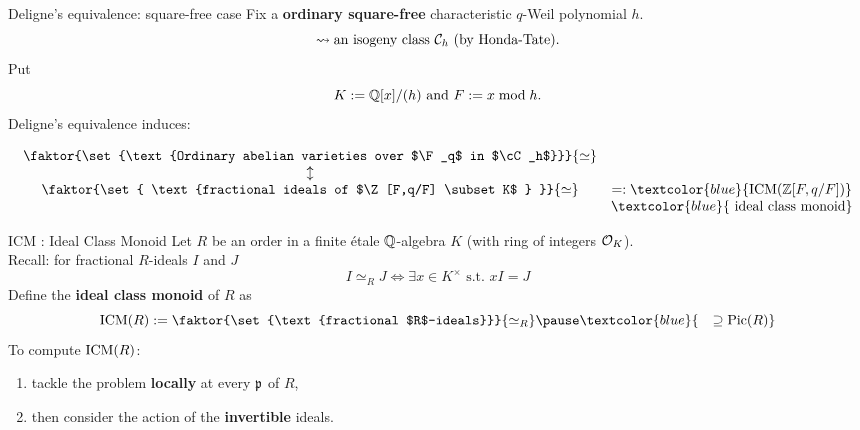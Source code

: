 \documentclass[handout]{beamer}
\begin{document}
\begin{frame}{ Deligne's equivalence: square-free case}
Fix a \textbf{ordinary square-free} characteristic $q$-Weil polynomial $h$.\\
\[\rightsquigarrow \text{an isogeny class ${\mathcal C}_h$ (by Honda-Tate)}.\]
\pause Put 
\[K := \mathbb{Q}[x]/(h) \text{ and } F:= x \bmod h. \]
\pause Deligne's equivalence induces:
\begin{theorem}[M.]
\vspace{-5mm}\[\begin{array}{cc}
\faktor{\set{\text{Ordinary abelian varieties over $\F_q$ in $\cC_h$}}}{\simeq} & \\
\updownarrow & \\
\faktor{\set{ \text{fractional ideals of $\Z[F,q/F] \subset K$ } }}{\simeq} & =:\textcolor{blue}{\ICM(\Z[F,q/F])}\\ 
  & \textcolor{blue}{\text{ ideal class monoid} }
  \end{array}\]
\end{theorem}
\end{frame}

\begin{frame}{ICM : Ideal Class Monoid}
Let $R$ be an order in a finite \'etale  $\mathbb{Q}$-algebra $K$ (with ring of integers ${\mathcal O}_K$).\\
\pause Recall: for fractional $R$-ideals $I$ and $J$
\[ I\simeq_R J \Longleftrightarrow \exists x \in K^\times \text{ s.t.~} xI=J \]
\pause Define the \textbf{ideal class monoid} of $R$ as
      \[\ICM(R) := \faktor{\set{\text{fractional $R$-ideals}}}{\simeq_R} \pause\textcolor{blue}{\quad\supseteq \Pic(R)}\]
\pause To compute $\operatorname{ICM}(R)$:
\begin{enumerate}[(1)]
\pause \item tackle the problem \textbf{locally} at every ${\mathfrak p}$ of $R$,
\pause \item then consider the action of the \textbf{invertible} ideals.
\end{enumerate}
\end{frame}
\end{document}
